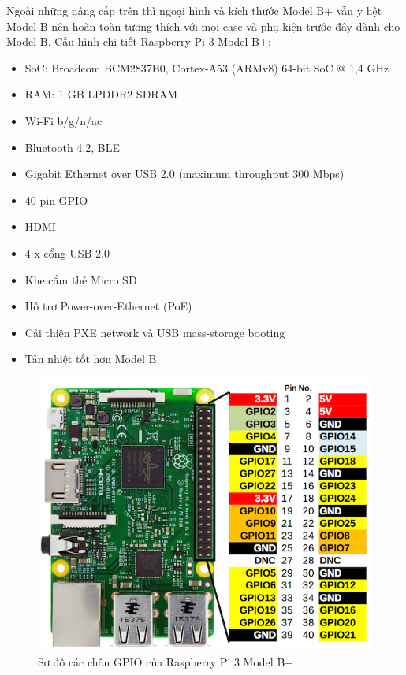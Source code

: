 \indent Ngoài những nâng cấp trên thì ngoại hình và kích thước Model B+ vẫn y hệt Model B nên hoàn toàn tương thích với mọi case và phụ kiện trước đây dành cho Model B. Cấu hình chi tiết Raspberry Pi 3 Model B+:
\begin{itemize}
	\item SoC: Broadcom BCM2837B0, Cortex-A53 (ARMv8) 64-bit SoC @ 1,4 GHz
	\item RAM: 1 GB LPDDR2 SDRAM
	\item Wi-Fi b/g/n/ac
	\item Bluetooth 4.2, BLE
	\item Gigabit Ethernet over USB 2.0 (maximum throughput 300 Mbps)
	\item 40-pin GPIO
	\item HDMI
	\item 4 x cổng USB 2.0
	\item Khe cắm thẻ Micro SD
	\item Hỗ trợ Power-over-Ethernet (PoE)
	\item Cải thiện PXE network và USB mass-storage booting
	\item Tản nhiệt tốt hơn Model B
\end{itemize}
\begin{figure}[H]
	\centering
	\includegraphics[scale=.5]{Chapter 3/image chapter 3/raspGPIO.jpg}
	\caption[Sơ đồ các chân GPIO của Raspberry Pi 3 Model B+]{Sơ đồ các chân GPIO của Raspberry Pi 3 Model B+}
	\label{hinh34}
\end{figure}
